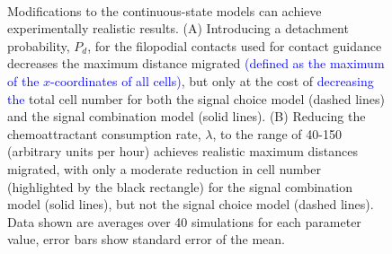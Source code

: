\documentclass[review]{elsarticle}
\newcommand\hl[1]{{\textcolor{blue}{#1}}}
\begin{document}
\begin{figure}
\centering
{}\
\caption{Modifications to the continuous-state models can achieve experimentally realistic results. (A) Introducing a detachment probability, $P_d$, for the filopodial contacts used for contact guidance decreases the maximum distance migrated \hl{(defined as the maximum of the $x$-coordinates of all cells)}, but only at the cost of \hl{decreasing the} total cell number for both the signal choice model (dashed lines) and the signal combination model (solid lines). (B) Reducing the chemoattractant consumption rate, $\lambda$, to the range of 40-150 (arbitrary units per hour) achieves realistic maximum distances migrated, with only a moderate reduction in cell number (highlighted by the black rectangle) for the signal combination model (solid lines), but not the signal choice model (dashed lines). Data shown are averages over 40 simulations for each parameter value, error bars show standard error of the mean.\label{figFurtherModel}}
\end{figure}
\end{document}
